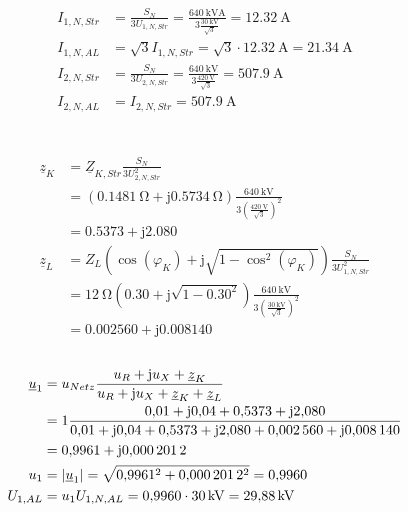 \documentclass[11pt,a4paper]{scrartcl}
\DeclarePairedDelimiter{\abs}{\lvert}{\rvert}
\newcommand{\mybr}[1]{\left(#1\right)}
\renewcommand{\j}{\mathrm{j}}
\newcommand{\Z}{\underline{Z}}
\newcommand{\z}{\underline{z}}
\renewcommand{\u}{\underline{u}}
\newcommand{\0}{_{\mybr{0}}}
\newcommand{\1}{_{\mybr{1}}}
\newcommand{\2}{_{\mybr{2}}}
\newcommand{\UPA}{U_{1,AL}}
\newcommand{\UPNS}{U_{1,N,Str}}
\newcommand{\USNS}{U_{2,N,Str}}
\newcommand{\UPNA}{U_{1,N,AL}}
\newcommand{\IPNS}{I_{1,N,Str}}
\newcommand{\ISNS}{I_{2,N,Str}}
\newcommand{\IPNA}{I_{1,N,AL}}
\newcommand{\ISNA}{I_{2,N,AL}}
\begin{document}
\section{}
\begin{align}
\IPNS&=\frac{S_N}{3\UPNS}=\frac{\SI{640}{\kilo\volt\ampere}}{3\frac{\SI{30}{\kilo\volt}}{\sqrt{3}}}=\SI{12.32}{\ampere}\\
\IPNA&=\sqrt{3}\IPNS=\sqrt{3}\cdot\SI{12.32}{\ampere}=\SI{21.34}{\ampere}\\
\ISNS&=\frac{S_N}{3\USNS}=\frac{\SI{640}{\kilo\volt}}{3\frac{\SI{420}{\volt}}{\sqrt{3}}}=\SI{507.9}{\ampere}\\
\ISNA&=\ISNS=\SI{507.9}{\ampere}
\end{align}

\section{}
\begin{align}
\z_K&=\Z_{K,Str}\frac{S_N}{3\USNS^2}\\
&=\mybr{\SI{0.1481}{\ohm}+\j\SI{0.5734}{\ohm}}\frac{\SI{640}{\kilo\volt}}{3\mybr{\frac{\SI{420}{\volt}}{\sqrt{3}}}^2}\\
&=\num{0.5373}+\j\num{2.080}\\
\z_L&=Z_L\mybr{\cos\mybr{\varphi_K}+\j\sqrt{1-\cos^2\mybr{\varphi_K}}}\frac{S_N}{3\UPNS^2}\\
&=\SI{12}{\ohm}\mybr{\num{0.30}+\j\sqrt{1-\num{0.30}^2}}\frac{\SI{640}{\kilo\volt}}{3\mybr{\frac{\SI{30}{\kilo\volt}}{\sqrt{3}}}^2}\\
&=\num{0.002560}+\j\num{0.008140}
\end{align}

\subsection{}
\begin{align}
\u_1&=u_{Netz}\frac{u_R+\j u_X+\z_K}{u_R+\j u_X+\z_K+\z_L}\\
&=1\frac{\num{0.01}+\j\num{0.04}+\num{0.5373}+\j\num{2.080}}{\num{0.01}+\j\num{0.04}+\num{0.5373}+\j\num{2.080}+\num{0.002560}+\j\num{0.008140}}\\
&=\num{0.9961}+\j\num{0.0002012}\\
u_1&=\abs{\u_1}=\sqrt{\num{0.9961}^2+\num{0.0002012}^2}=\num{0.9960}\\
\UPA&=u_1\UPNA=\num{0.9960}\cdot\SI{30}{\kilo\volt}=\SI{29.88}{\kilo\volt}
\end{align}
\end{document}
